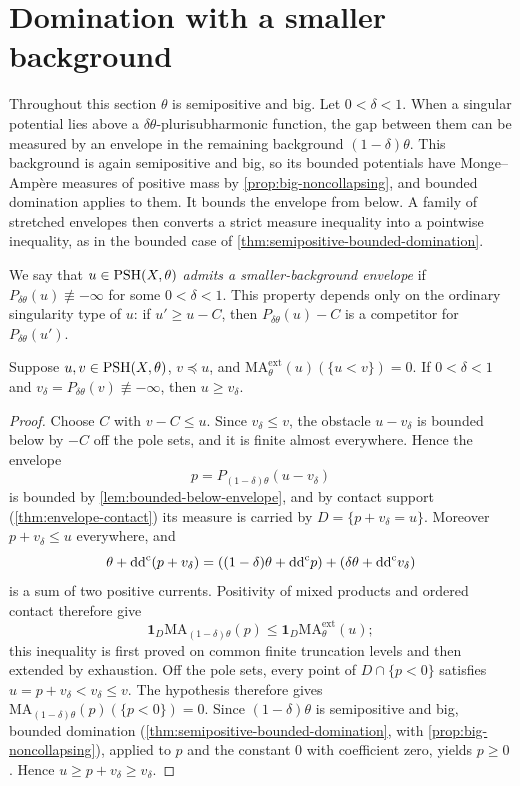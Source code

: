 \section{Domination with a smaller background}

Throughout this section $\theta$ is semipositive and big. Let $0<\delta<1$. When a singular potential lies above a $\delta\theta$-plurisubharmonic function, the gap between them can be measured by an envelope in the remaining background $(1-\delta)\theta$. This background is again semipositive and big, so its bounded potentials have Monge--Amp\`ere measures of positive mass by \cref{prop:big-noncollapsing}, and bounded domination applies to them. It bounds the envelope from below. A family of stretched envelopes then converts a strict measure inequality into a pointwise inequality, as in the bounded case of \cref{thm:semipositive-bounded-domination}.

We say that $u\in\mathrm{PSH}(X,\theta)$ \emph{admits a smaller-background envelope} if $P_{\delta\theta}(u)\not\equiv-\infty$ for some $0<\delta<1$. This property depends only on the ordinary singularity type of $u$: if $u'\geq u-C$, then $P_{\delta\theta}(u)-C$ is a competitor for $P_{\delta\theta}(u')$.

\begin{lemma}\label{lem:singular-zero-domination}
Suppose $u,v\in\mathrm{PSH}(X,\theta)$, $v\preceq u$, and
$\mathrm{MA}^{\mathrm{ext}}_\theta(u)(\{u<v\})=0$. If $0<\delta<1$ and $v_\delta=P_{\delta\theta}(v)\not\equiv-\infty$, then $u\geq v_\delta$.
\end{lemma}
\begin{proof}
Choose $C$ with $v-C\leq u$. Since $v_\delta\leq v$, the obstacle $u-v_\delta$ is bounded below by $-C$ off the pole sets, and it is finite almost everywhere. Hence the envelope
\[
 p=P_{(1-\delta)\theta}(u-v_\delta)
\]
is bounded by \cref{lem:bounded-below-envelope}, and by contact support (\cref{thm:envelope-contact}) its measure is carried by $D=\{p+v_\delta=u\}$. Moreover $p+v_\delta\leq u$ everywhere, and
\[
 \theta+\mathrm{dd}^{\mathrm{c}}(p+v_\delta)
 =((1-\delta)\theta+\mathrm{dd}^{\mathrm{c}} p)+(\delta\theta+\mathrm{dd}^{\mathrm{c}} v_\delta)
\]
is a sum of two positive currents. Positivity of mixed products and ordered contact therefore give
\[
 \mathbf1_D\mathrm{MA}_{(1-\delta)\theta}(p)
 \leq\mathbf1_D\mathrm{MA}^{\mathrm{ext}}_\theta(u);
\]
this inequality is first proved on common finite truncation levels and then extended by exhaustion. Off the pole sets, every point of $D\cap\{p<0\}$ satisfies
$u=p+v_\delta<v_\delta\leq v$. The hypothesis therefore gives
$\mathrm{MA}_{(1-\delta)\theta}(p)(\{p<0\})=0$. Since $(1-\delta)\theta$ is semipositive and big, bounded domination (\cref{thm:semipositive-bounded-domination}, with \cref{prop:big-noncollapsing}), applied to $p$ and the constant $0$ with coefficient zero, yields $p\geq0$. Hence $u\geq p+v_\delta\geq v_\delta$.
\end{proof}

